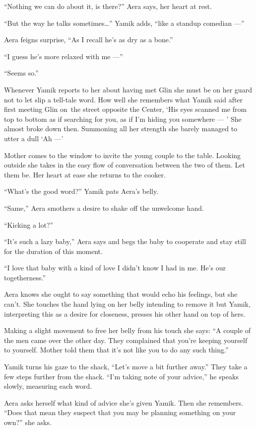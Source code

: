 \documentclass[twoside,11pt,openany]{book}
\begin{document}
``Nothing we can do about it, is there?'' Aera says, her heart at rest.

``But the way he talks sometimes{\ldots}'' Yamik adds, ``like a standup comedian
---''

Aera feigns surprise, ``As I recall he's as dry as a bone.''

``I guess he's more relaxed with me ---''

``Seems so.''

 Whenever Yamik reports to her about having met Glin she must be on her guard not to let slip a tell-tale word. How well
she remembers what Yamik said after first meeting Glin on~the street opposite the Center, `His eyes scanned me from top
to bottom as if searching for you, as if I'm hiding you somewhere --- ' She almost broke down then. Summoning all her
strength she barely managed to utter a dull `Ah ---'

Mother comes to the window to invite the young couple to the table. Looking outside she{ }takes in the
easy flow of conversation between the two of them. Let them be. Her heart at ease she returns to the cooker.

``What's the good word?'' Yamik pats Aera's belly.

``Same,'' Aera smothers a desire to shake off the unwelcome hand.

``Kicking a lot?''

``It's such a lazy baby,'' Aera says and begs the baby to cooperate and stay still for the
duration of this moment.

``I love that baby with a kind of love I didn't know I had in me. He's our togetherness.''

Aera knows she ought to say something that would echo his feelings, but she can't. She touches the hand lying on her
belly intending to remove it but Yamik, interpreting this as a desire for closeness, presses his other hand on top of
hers.

Making a slight movement to free her belly from his touch she says:  ``A couple of the men came over the
other day. They complained that you're keeping yourself to yourself. Mother told them that it's not like you to do any
such thing.''

Yamik turns his gaze to the shack, ``Let's move a bit further away.'' They take a few steps
further from the shack. ``I'm taking note of your advice,'' he speaks slowly, measuring each
word.

Aera asks herself what kind of advice she's given Yamik. Then she remembers. ``Does that mean they
suspect that you may be planning something on your own?'' she asks.
\end{document}
